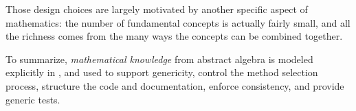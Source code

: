 
Those design choices are largely motivated by another specific aspect
of mathematics: the number of fundamental concepts is actually fairly
small, and all the richness comes from the many ways the concepts can
be combined together.

To summarize, \emph{mathematical knowledge} from abstract algebra is
modeled explicitly in \Sage, and used to support genericity, control
the method selection process, structure the code and documentation,
enforce consistency, and provide generic tests.


